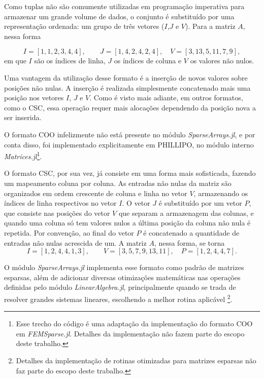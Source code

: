 Como tuplas não são comumente utilizadas em programação imperativa para armazenar um grande volume de dados, o conjunto é substituído por uma representação ordenada: um grupo de três vetores ($I$,$J$ e $V$). Para a matriz $A$, nessa forma

\begin{equation}
    I =  [1, 1, 2, 3, 4, 4], \qquad J = [1, 4, 2, 4, 2, 4], \quad V = [3, 13, 5, 11, 7, 9],
    \label{eq:coo_2}
\end{equation}
em que $I$ são os índices de linha, $J$ os índices de coluna e $V$ os valores não nulos.

Uma vantagem da utilização desse formato é a inserção de novos valores sobre posições não nulas. A inserção é realizada simplesmente concatenado mais uma posição nos vetores $I$, $J$ e $V$. Como é visto mais adiante, em outros formatos, como o CSC, essa operação requer mais alocações dependendo da posição nova a ser inserida.

O formato COO infelizmente não está presente no módulo \emph{SparseArrays.jl}, e por conta disso, foi implementado explicitamente em PHILLIPO, no módulo interno \emph{Matrices.jl}\footnote{Esse trecho do código é uma adaptação da implementação do formato COO em \emph{FEMSparse.jl}. Detalhes da implementação não fazem parte do escopo deste trabalho.}.

O formato CSC, por sua vez, já consiste em uma forma mais sofisticada, fazendo um mapeamento coluna por coluna. As entradas não nulas da matriz são organizados em ordem crescente de coluna e linha no vetor $V$, armazenando os índices de linha respectivos no vetor $I$. O vetor $J$ é substituído por um vetor $P$, que consiste nas posições do vetor $V$ que separam a armazenagem das colunas, e quando uma coluna só tem valores nulos a última posição da coluna não nula é repetida. Por convenção, ao final do vetor $P$ é concatenado a quantidade de entradas não nulas acrescida de um. A matriz $A$, nessa forma, se torna
\begin{equation}
    I = [1, 2, 4, 4, 1, 3], \qquad V = [3, 5, 7, 9, 13, 11], \quad P = [1,2,4,4,7].
    \label{eq:coo_3}
\end{equation}

O módulo \emph{SparseArrays.jl} implementa esse formato como padrão de matrizes esparsas, além de adicionar diversas otimizações matemáticas nas operações definidas pelo módulo \emph{LinearAlgebra.jl}, principalmente quando se trada de resolver grandes sistemas lineares, escolhendo a melhor rotina aplicável \footnote{Detalhes da implementação de rotinas otimizadas para matrizes esparsas não faz parte do escopo deste trabalho.}.


